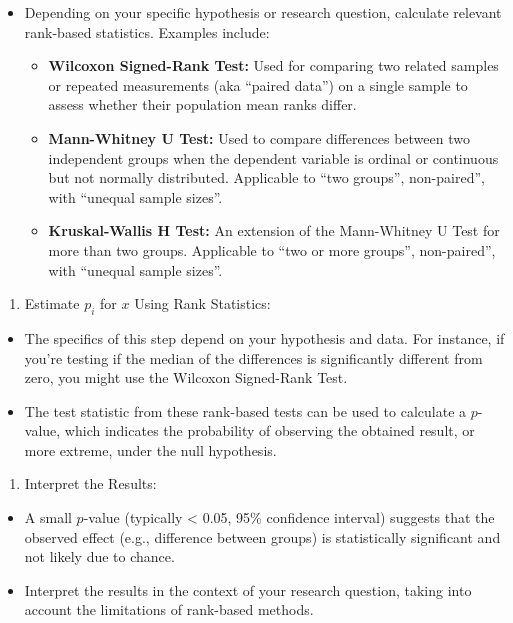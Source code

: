 \documentclass[
  12pt,
  a4paper,
]{article}
\providecommand{\tightlist}{%
  \setlength{\itemsep}{0pt}\setlength{\parskip}{0pt}}
\numberwithin{equation}{section}
\theoremstyle{plain}
\theoremstyle{definition}
\theoremstyle{remark}
\theoremstyle{note}
\begin{document}
\begin{itemize}
\tightlist
\item
  Depending on your specific hypothesis or research question, calculate
  relevant rank-based statistics. Examples include:

  \begin{itemize}
  \tightlist
  \item
    \textbf{Wilcoxon Signed-Rank Test:} Used for comparing two related
    samples or repeated measurements (aka ``paired data'') on a single
    sample to assess whether their population mean ranks differ.
  \item
    \textbf{Mann-Whitney U Test:} Used to compare differences between
    two independent groups when the dependent variable is ordinal or
    continuous but not normally distributed. Applicable to ``two
    groups'', non-paired'', with ``unequal sample sizes''.
  \item
    \textbf{Kruskal-Wallis H Test:} An extension of the Mann-Whitney U
    Test for more than two groups. Applicable to ``two or more groups'',
    non-paired'', with ``unequal sample sizes''.
  \end{itemize}
\end{itemize}

\begin{enumerate}
\def\labelenumi{\arabic{enumi}.}
\setcounter{enumi}{3}
\tightlist
\item
  Estimate \(p_i\) for \(x\) Using Rank Statistics:
\end{enumerate}

\begin{itemize}
\tightlist
\item
  The specifics of this step depend on your hypothesis and data. For
  instance, if you're testing if the median of the differences is
  significantly different from zero, you might use the Wilcoxon
  Signed-Rank Test.
\item
  The test statistic from these rank-based tests can be used to
  calculate a \(p\)-value, which indicates the probability of observing
  the obtained result, or more extreme, under the null hypothesis.
\end{itemize}

\begin{enumerate}
\def\labelenumi{\arabic{enumi}.}
\setcounter{enumi}{4}
\tightlist
\item
  Interpret the Results:
\end{enumerate}

\begin{itemize}
\tightlist
\item
  A small \(p\)-value (typically \textless{} 0.05, 95\% confidence
  interval) suggests that the observed effect (e.g., difference between
  groups) is statistically significant and not likely due to chance.
\item
  Interpret the results in the context of your research question, taking
  into account the limitations of rank-based methods.
\end{itemize}
\end{document}
